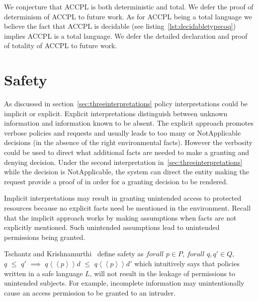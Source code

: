 We conjecture that \ac{ACCPL} is both deterministic and total. We defer the proof of determinism of \ac{ACCPL} to future work. As for \ac{ACCPL} being a total language we believe the fact that \ac{ACCPL} is decidable (see listing~\ref{lst:decidabletypecoq}) implies \ac{ACCPL} is a total language. We defer the detailed declaration and proof of totality of \ac{ACCPL} to future work.

\section{Safety}

As discussed in section~\ref{sec:threeinterpretations} policy interpretations could be implicit or explicit. Explicit interpretations distinguish between unknown information and information known to be absent. The explicit approach promotes verbose policies and requests and usually leads to too many  or NotApplicable decisions (in the absence of the right environmental facts). However the verbosity could be used to direct what additional facts are needed to make a granting and denying decision. Under the second interpretation in~\ref{sec:threeinterpretations} while the decision is NotApplicable, the system can direct the entity making the request provide a proof of  in order for a granting decision to be rendered. 

Implicit interpretations may result in granting unintended access to protected resources because no explicit facts need be mentioned in the environment. Recall that the implicit approach works by making assumptions when facts are not explicitly mentioned. Such unintended assumptions lead to unintended permissions being granted.

Tschantz and Krishnamurthi~\cite{Tschantz} define safety as $forall$ $p \in P$, $forall$ $q, q' \in Q$, \\$q$ $\leq$ $q'$ $\implies$ $q \left\langle\left\langle p  \right\rangle\right\rangle d$ $\leq$ $q \left\langle\left\langle p  \right\rangle\right\rangle d'$ which intuitively says that policies written in a safe language $L$, will not result in the leakage of permissions to unintended subjects. For example, incomplete information may unintentionally cause an access permission to be granted to an intruder. 

